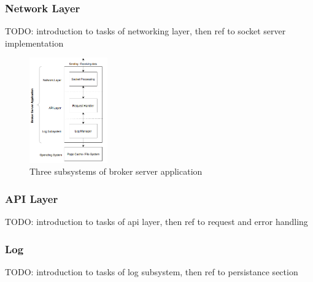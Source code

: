 \subsubsection{Network Layer}

TODO: introduction to tasks of networking layer, then ref to socket server implementation

\begin{figure}[H]
    \centering
    \includegraphics[width=0.3\textwidth]{images/design-subsystems.png}
    \caption{Three subsystems of broker server application}
    \label{fig:architecture-subsystems.png}
\end{figure}

\subsubsection{API Layer}

TODO: introduction to tasks of api layer, then ref to request and error handling

\subsubsection{Log}

TODO: introduction to tasks of log subsystem, then ref to persistance section



